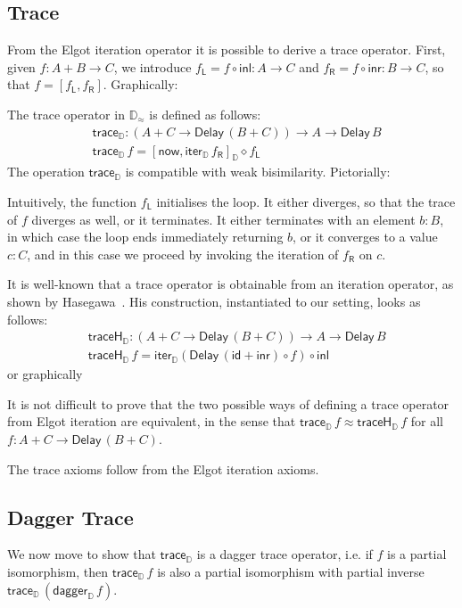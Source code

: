 \documentclass[runningheads,a4paper]{llncs}
\newcommand{\comp}{\circ}
\newcommand{\inl}{\mathsf{inl}}
\newcommand{\inr}{\mathsf{inr}}
\newcommand{\mapL}[1]{#1_{\mathsf{L}}}
\newcommand{\mapR}[1]{#1_{\mathsf{R}}}
\newcommand{\id}{\mathsf{id}}
\newcommand{\Delay}{\ensuremath{\mathsf{Delay}\,}}
\newcommand{\now}{\mathsf{now}}
\newcommand{\D}{\mathbb{D}}
\newcommand{\Dapprox}{\mathbb{D}_{\approx}}
\newcommand{\copairD}[2]{[#1,#2]_{\D}}
\newcommand{\iterD}{\mathsf{iter}_\D}
\newcommand{\traceD}{\mathsf{trace}_\D}
\newcommand{\traceHD}{\mathsf{traceH}_\D}
\newcommand{\daggerD}{\mathsf{dagger}_\D}
\begin{document}
\subsection{Trace}\label{sec:trace}

From the Elgot iteration operator it is possible to derive a trace
operator. First, given $f : A + B \to C$, we introduce
$\mapL f = f \comp \inl : A \to C$ and
$\mapR f = f \comp \inr : B \to C$, so that $f = [\mapL f , \mapR f]$.
Graphically:
 
The trace operator in $\Dapprox$ is defined as follows:
\begin{align*}
& \traceD : (A + C \to \Delay (B + C)) \to A \to \Delay B \\
& \traceD \,f = \copairD{\now}{\iterD \,\mapR f}\diamond \mapL f
\end{align*}
The operation $\traceD$ is compatible with weak bisimilarity. 
Pictorially:


Intuitively, the function $\mapL f$ initialises the loop. It either
diverges, so that the trace of $f$ diverges as well, or it terminates. It either terminates with
an element $b : B$, in which case the loop ends immediately returning
$b$, or it converges to a value $c : C$, and in this case we proceed
by  invoking the iteration of $\mapR f$ on $c$.

It is well-known that a trace operator is obtainable from an iteration
operator, as shown by Hasegawa~\cite{Hasegawa97}. His construction,
instantiated to our setting, looks as follows:
\begin{align*}
& \traceHD : (A + C \to \Delay (B + C)) \to A \to \Delay B \\
& \traceHD \,f = \iterD (\Delay (\id + \inr) \comp f) \comp \inl
\end{align*}
or graphically

It is not difficult to prove that the two possible ways of defining a
trace operator from Elgot iteration are equivalent, in the sense that
$\traceD\,f \approx \traceHD\,f$ for all $f : A + C \to \Delay (B +
C)$. 

The trace axioms follow from the Elgot iteration axioms.

\subsection{Dagger Trace}\label{sec:daggertrace}

We now move to show that $\traceD$ is a dagger trace operator,
i.e. if $f$ is a partial isomorphism, then
$\traceD\,f$ is also a partial isomorphism with partial inverse $\traceD\,(\daggerD\,f)$.
\end{document}
